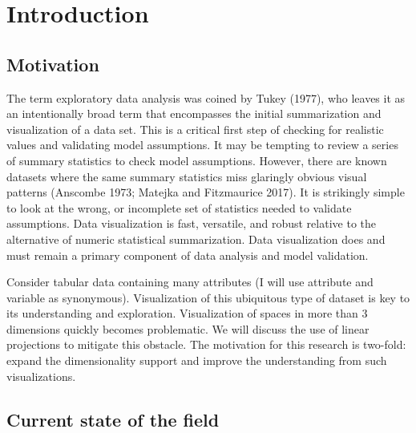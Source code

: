 \documentclass[
  11,
]{article}
\begin{document}
\newpage

% 

\doublespacing

\newpage
{}
\hypersetup{linkcolor = blue}

{
\hypersetup{linkcolor=}
\setcounter{tocdepth}{2}
\tableofcontents
}
\hypertarget{sec:intro}{%
\section{Introduction}\label{sec:intro}}

\hypertarget{motivation}{%
\subsection{Motivation}\label{motivation}}

The term exploratory data analysis was coined by Tukey (1977), who leaves it as an intentionally broad term that encompasses the initial summarization and visualization of a data set. This is a critical first step of checking for realistic values and validating model assumptions. It may be tempting to review a series of summary statistics to check model assumptions. However, there are known datasets where the same summary statistics miss glaringly obvious visual patterns (Anscombe 1973; Matejka and Fitzmaurice 2017). It is strikingly simple to look at the wrong, or incomplete set of statistics needed to validate assumptions. Data visualization is fast, versatile, and robust relative to the alternative of numeric statistical summarization. Data visualization does and must remain a primary component of data analysis and model validation.

Consider tabular data containing many attributes (I will use attribute and variable as synonymous). Visualization of this ubiquitous type of dataset is key to its understanding and exploration. Visualization of spaces in more than 3 dimensions quickly becomes problematic. We will discuss the use of linear projections to mitigate this obstacle. The motivation for this research is two-fold: expand the dimensionality support and improve the understanding from such visualizations.

\hypertarget{current-state-of-the-field}{%
\subsection{Current state of the field}\label{current-state-of-the-field}}
\end{document}
